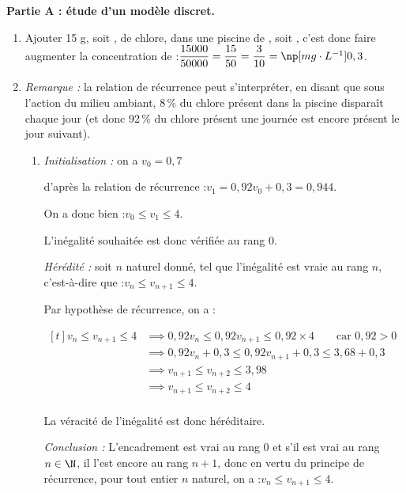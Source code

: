 \medskip

\textbf{Partie A : étude d'un modèle discret.}

\smallskip

\begin{enumerate}
	\item Ajouter 15 g, soit , de chlore, dans une piscine de , soit , c'est donc faire augmenter la concentration de :\quad$\dfrac{15000}{50000} =\dfrac{15}{50}= \dfrac{3}{10} = \np[mg\cdot L^{-1}]{0,3}$.

	\item \emph{Remarque :} la relation de récurrence peut s'interpréter, en disant que sous l'action du milieu ambiant, 8\,\% du chlore présent dans la piscine disparaît chaque jour (et donc 92\,\% du chlore présent une journée est encore présent le jour suivant).
	\begin{enumerate}
		\item \emph{Initialisation :} on a \quad $v_0 = 0,7$

		d'après la relation de récurrence :\quad $v_1 = 0,92v_0 + 0,3 = 0,944$.

		On a donc bien :\quad $v_0 \leqslant v_1 \leqslant 4$.

		L'inégalité souhaitée est donc vérifiée au rang 0.

		\smallskip

		\emph{Hérédité :} soit $n$ naturel donné, tel que l'inégalité est vraie au rang $n$, c'est-à-dire que :\quad $v_n \leqslant v_{n+1}\leqslant 4$.

Par hypothèse de récurrence, on a :

$\begin{aligned}[t] v_n \leqslant v_{n+1}\leqslant 4 &\implies 0,92 v_n \leqslant 0,92v_{n+1} \leqslant 0,92 \times 4\qquad\text{car } 0,92 >0\\
		&\implies 0,92 v_n + 0,3 \leqslant 0,92v_{n+1}+ 0,3 \leqslant 3,68 + 0,3 \\
		&\implies v_{n+1} \leqslant v_{n+2}  \leqslant 3,98 \\
		&\implies v_{n+1} \leqslant v_{n+2}  \leqslant 4\\
		\end{aligned}$

La véracité de l'inégalité est donc héréditaire.

\emph{Conclusion :} L'encadrement est vrai au rang 0 et s'il est vrai au rang $n \in \N$, il l'est encore au rang $n + 1$, donc en vertu du principe de récurrence, pour tout entier $n$ naturel, on a :\quad $v_n \leqslant v_{n+1} \leqslant 4$.


\end{enumerate}
\end{enumerate}
